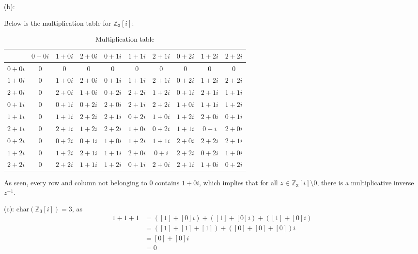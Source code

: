 \documentclass{article}
\theoremstyle{plain} %
\numberwithin{thm}{section} %
\theoremstyle{definition}
\begin{document}
\begin{question}{3}
        \medskip

        (b):

        Below is the multiplication table for \(\mathbb{Z}_3[i]\):
        \begin{table}[H]
            \centering
            \begin{tabular}{c|c|c|c|c|c|c|c|c|c}
                \toprule
                    & \(0 + 0i\) & \(1 + 0i\) & \(2 + 0i\) & \(0 + 1i\) & \(1 + 1i\) & \(2 + 1i\) & \(0 + 2i\) & \(1 + 2i\) & \(2 + 2i\) \\
                \midrule
                    \(0 + 0i\) & 0 & 0 & 0 & 0 & 0 & 0 & 0 & 0 & 0 \\
                    \(1 + 0i\) & 0 & \(1 + 0i\) & \(2 + 0i\) & \(0 + 1i\) & \(1 + 1i\) & \(2 + 1i\) & \(0 + 2i\) & \(1 + 2i\) & \(2 + 2i\) \\
                    \(2 + 0i\) & 0 & \(2 + 0i\) & \(1 + 0i\) & \(0 + 2i\) & \(2 + 2i\) & \(1 + 2i\) & \(0 + 1i\) & \(2 + 1i\) & \(1 + 1i\) \\
                    \(0 + 1i\) & 0 & \(0 + 1i\) & \(0 + 2i\) & \(2 + 0i\) & \(2 + 1i\) & \(2 + 2i\) & \(1 + 0i\) & \(1 + 1i\) & \(1 + 2i\) \\
                    \(1 + 1i\) & 0 & \(1 + 1i\) & \(2 + 2i\) & \(2 + 1i\) & \(0 + 2i\) & \(1 + 0i\) & \(1 + 2i\) & \(2 + 0i\) & \(0 + 1i\) \\
                    \(2 + 1i\) & 0 & \(2 + 1i\) & \(1 + 2i\) & \(2 + 2i\) & \(1 + 0i\) & \(0 + 2i\) & \(1 + 1i\) & \(0 + i\) & \(2 + 0i\) \\
                    \(0 + 2i\) & 0 & \(0 + 2i\) & \(0 + 1i\) & \(1 + 0i\) & \(1 + 2i\) & \(1 + 1i\) & \(2 + 0i\) & \(2 + 2i\) & \(2 + 1i\) \\
                    \(1 + 2i\) & 0 & \(1 + 2i\) & \(2 + 1i\) & \(1 + 1i\) & \(2 + 0i\) & \(0 + i\) & \(2 + 2i\) & \(0 + 2i\) & \(1 + 0i\) \\
                    \(2 + 2i\) & 0 & \(2 + 2i\) & \(1 + 1i\) & \(1 + 2i\) & \(0 + 1i\) & \(2 + 0i\) & \(2 + 1i\) & \(1 + 0i\) & \(0 + 2i\) \\
                \bottomrule
            \end{tabular}
            \caption{Multiplication table}
            \label{tab:e}
        \end{table}

        As seen, every row and column not belonging to \(0\) contains \(1 + 0i\), which implies that for all \(z \in \mathbb{Z}_3[i]\setminus {0}\), there is a multiplicative inverse \(z^{-1}\).

        \medskip

        (c):
        \(\mathrm{char}(\mathbb{Z}_3[i]) = 3\), as
        \begin{align*}
            1 + 1 + 1 &= ([1] + [0]i) + ([1] + [0]i) + ([1] + [0]i) \\
            &= ([1] + [1] + [1]) + ([0] + [0] + [0])i \\
            &= [0] + [0]i \\
            &= 0
        \end{align*}
    \end{question}
\end{document}
